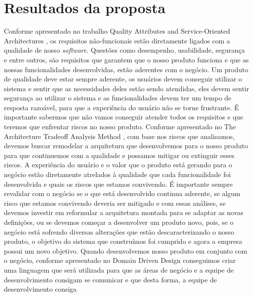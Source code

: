   \chapter{Resultados da proposta}
    Conforme apresentado no trabalho Quality Attributes and Service-Oriented Architectures
    \cite{O'BrienQualityAttributes2005}, os requisitos não-funcionais estão diretamente
    ligados com a qualidade de nosso \textit{software}. Questões como desempenho,
    usabilidade, segurança e entre outros, são requisitos que garantem que o nosso
    produto funciona e que as nossas funcionalidades desenvolvidas, estão aderentes
    com o negócio. \newline
    Um produto de qualidade deve estar sempre aderente, os usuários devem conseguir
    utilizar o sistema e sentir que as necessidades deles estão sendo atendidas,
    eles devem sentir segurança ao utilizar o sistema e as funcionalidades devem
    ter um tempo de resposta razoável, para que a experiência do usuário não se
    torne frustrante. É importante sabermos que não vamos conseguir atender todos
    os requisitos e que teremos que enfrentar riscos no nosso produto. Conforme
    apresentado no The Architecture Tradeoff Analysis Method \cite{KazmanTheArchitecture1998},
    com base nos riscos que analisamos, devemos buscar remodelar a arquitetura que
    desenvolvemos para o nosso produto para que continuemos com a qualidade e possamos
    mitigar ou extinguir esses riscos. A experiência do usuário e o valor que o
    produto está gerando para o negócio estão diretamente atrelados à qualidade
    que cada funcionalidade foi desenvolvida e quais os riscos que estamos convivendo.
    É importante sempre revalidar com o negócio se o que está desenvolvido continua
    aderente, se algum risco que estamos convivendo deveria ser mitigado e com essas
    análises, se devemos investir em reformular a arquitetura montada para se
    adaptar as novas definições, ou se devemos começar a desenvolver um produto
    novo, pois, se o negócio está sofrendo diversas alterações que estão descaracterizando
    o nosso produto, o objetivo do sistema que construímos foi cumprido e agora
    a empresa possui um novo objetivo. \newline
    Quando desenvolvemos nosso produto em conjunto com o negócio, conforme apresentado
    no Domain Driven Design \cite{DomainDrivenDesign} conseguimos criar uma linguagem
    que será utilizada para que as áreas de negócio e a equipe de desenvolvimento
    consigam se comunicar e que desta forma, a equipe de desenvolvimento consiga
